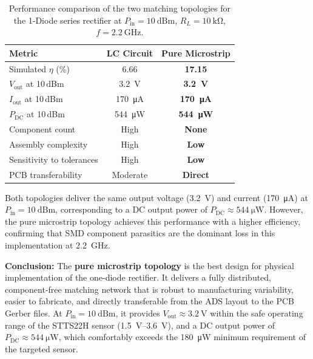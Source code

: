 \begin{table}[H]
    \centering
    \caption{Performance comparison of the two matching topologies
             for the 1-Diode series rectifier at
             $P_\mathrm{in} = \SI{10}{\text{dBm}}$,
             $R_L = \SI{10}{\kilo\ohm}$, $f = \SI{2.2}{\giga\hertz}$.}
    \label{tab:1d_comparison}
    \begin{tabular}{lcc}
        \toprule
        \textbf{Metric} &
        \textbf{LC Circuit} &
        \textbf{Pure Microstrip} \\
        \midrule
        Simulated $\eta$ (\%)        & 6.66
                                     & \textbf{17.15} \\
        $V_\mathrm{out}$ at 10\,dBm  & \SI{3.2}{\volt}
                                     & \textbf{\SI{3.2}{\volt}} \\
        $I_\mathrm{out}$ at 10\,dBm  & \SI{170}{\micro\ampere}
                                     & \textbf{\SI{170}{\micro\ampere}} \\
        $P_\mathrm{DC}$ at 10\,dBm   & \SI{544}{\micro\watt}
                                     & \textbf{\SI{544}{\micro\watt}} \\
        Component count              & High
                                     & \textbf{None} \\
        Assembly complexity          & High
                                     & \textbf{Low} \\
        Sensitivity to tolerances    & High
                                     & \textbf{Low} \\
        PCB transferability          & Moderate
                                     & \textbf{Direct} \\
        \bottomrule
    \end{tabular}
\end{table}

Both topologies deliver the same output voltage (\SI{3.2}{\volt})
and current (\SI{170}{\micro\ampere}) at $P_\mathrm{in} =
\SI{10}{\text{dBm}}$, corresponding to a DC output power of
$P_\mathrm{DC} \approx \SI{544}{\micro\watt}$. However, the pure
microstrip topology achieves this performance with a
higher efficiency, confirming that SMD
component parasitics are the dominant loss in this
implementation at \SI{2.2}{\giga\hertz}.

\textbf{Conclusion:} The \textbf{pure microstrip topology} is the
best design for physical implementation of the one-diode
rectifier. It delivers a fully distributed, component-free matching
network that is robust to manufacturing variability,
easier to fabricate, and directly transferable from the ADS layout
to the PCB Gerber files. At $P_\mathrm{in} = \SI{10}{\text{dBm}}$,
it provides $V_\mathrm{out} \approx \SI{3.2}{\volt}$ within the
safe operating range of the STTS22H sensor
(\SIrange{1.5}{3.6}{\volt}), and a DC output power of
$P_\mathrm{DC} \approx \SI{544}{\micro\watt}$, which comfortably
exceeds the \SI{180}{\micro\watt} minimum requirement of the
targeted sensor.

